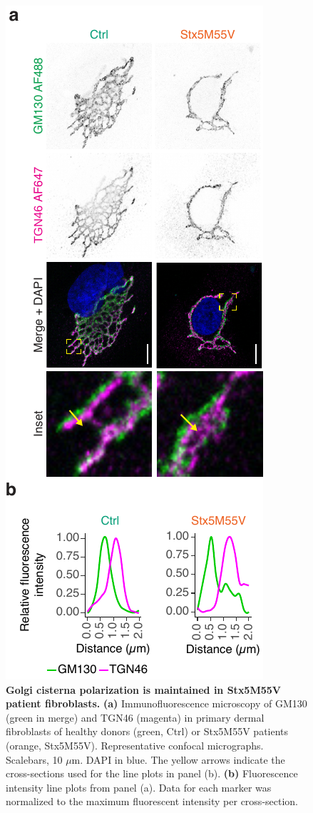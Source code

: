 \clearpage

\begin{figure}
    \includegraphics[keepaspectratio=true]{chapters/chapter6/chapter6_SupplementaryFigure10.pdf}
    \caption{\textbf{Golgi cisterna polarization is maintained in Stx5M55V patient fibroblasts.} \textbf{(a)} Immunofluorescence microscopy of GM130 (green in merge) and TGN46 (magenta) in primary dermal fibroblasts of healthy donors (green, Ctrl) or Stx5M55V patients (orange, Stx5M55V). Representative confocal micrographs. Scalebars, 10 $\mu$m. DAPI in blue. The yellow arrows indicate the cross-sections used for the line plots in panel (b). \textbf{(b)} Fluorescence intensity line plots from panel (a). Data for each marker was normalized to the maximum fluorescent intensity per cross-section.}
    \label{fig:ch6supfig10}
\end{figure}

